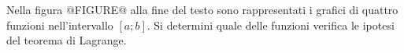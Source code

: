 Nella figura @FIGURE@ alla fine del testo sono rappresentati i grafici di quattro funzioni nell’intervallo $[a; b]$.
Si determini quale delle funzioni verifica le ipotesi del teorema di Lagrange.
